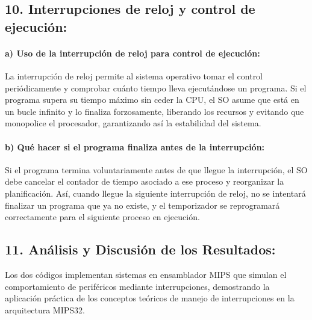 \documentclass[12pt]{article}
\begin{document}
\begin{center}
\subsection*{10. Interrupciones de reloj y control de ejecución:}
\end{center}

\paragraph*{a) Uso de la interrupción de reloj para control de ejecución:}

\vspace{0.2cm}

La interrupción de reloj permite al sistema operativo tomar el control periódicamente y comprobar cuánto tiempo lleva ejecutándose un programa. Si el programa supera su tiempo máximo sin ceder la CPU, el SO asume que está en un bucle infinito y lo finaliza forzosamente, liberando los recursos y evitando que monopolice el procesador, garantizando así la estabilidad del sistema.

\vspace{0.2cm}

\paragraph*{b) Qué hacer si el programa finaliza antes de la interrupción:}

\vspace{0.2cm}

Si el programa termina voluntariamente antes de que llegue la interrupción, el SO debe cancelar el contador de tiempo asociado a ese proceso y reorganizar la planificación. Así, cuando llegue la siguiente interrupción de reloj, no se intentará finalizar un programa que ya no existe, y el temporizador se reprogramará correctamente para el siguiente proceso en ejecución.

\begin{center}
\subsection*{11. Análisis y Discusión de los Resultados:}
\end{center}

Los dos códigos implementan sistemas en ensamblador MIPS que simulan el comportamiento de periféricos mediante interrupciones, demostrando la aplicación práctica de los conceptos teóricos de manejo de interrupciones en la arquitectura MIPS32.
\end{document}
